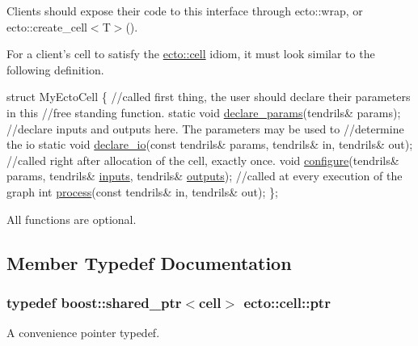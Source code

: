 Clients should expose their code to this interface through ecto\-::wrap, or ecto\-::create\-\_\-cell$<$\-T$>$().

For a client's cell to satisfy the \hyperlink{structecto_1_1cell}{ecto\-::cell} idiom, it must look similar to the following definition. 
\begin{DoxyCode}
\textcolor{keyword}{struct }MyEctoCell
\{
  \textcolor{comment}{//called first thing, the user should declare their parameters in this}
  \textcolor{comment}{//free standing function.}
  \textcolor{keyword}{static} \textcolor{keywordtype}{void} \hyperlink{structecto_1_1cell_a5c3c204f531de15920cb9d3db3ecfc4c}{declare\_params}(tendrils& params);
  \textcolor{comment}{//declare inputs and outputs here. The parameters may be used to}
  \textcolor{comment}{//determine the io}
  \textcolor{keyword}{static} \textcolor{keywordtype}{void} \hyperlink{structecto_1_1cell_af6c3782ed0d1c258bcf5050b4af272b4}{declare\_io}(\textcolor{keyword}{const} tendrils& params, tendrils& in, tendrils& out);
  \textcolor{comment}{//called right after allocation of the cell, exactly once.}
  \textcolor{keywordtype}{void} \hyperlink{structecto_1_1cell_a30d48d21d6ffa86af4888f78e92241af}{configure}(tendrils& params, tendrils& \hyperlink{structecto_1_1cell_a65099b0458a7761b8bfa7a1ddc17e92f}{inputs}, tendrils& 
      \hyperlink{structecto_1_1cell_a93951743b603faba35312ebdb07ceb22}{outputs});
  \textcolor{comment}{//called at every execution of the graph}
  \textcolor{keywordtype}{int} \hyperlink{structecto_1_1cell_a6b810671ee21f5dddbc1206abfb999f3}{process}(\textcolor{keyword}{const} tendrils& in, tendrils& out);
\};
\end{DoxyCode}


All functions are optional. 

\subsection{Member Typedef Documentation}
\hypertarget{structecto_1_1cell_af2cab9d2bc012088c4f58c40da57a862}{
\subsubsection[{ptr}]{\setlength{\rightskip}{0pt plus 5cm}typedef boost\-::shared\-\_\-ptr$<${\bf cell}$>$ {\bf ecto\-::cell\-::ptr}}}\label{structecto_1_1cell_af2cab9d2bc012088c4f58c40da57a862}


A convenience pointer typedef. 


